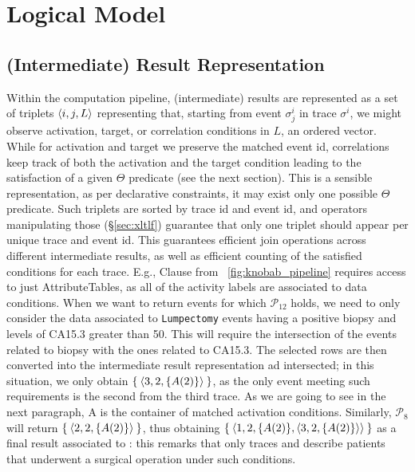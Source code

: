 \section{Logical Model}

\subsection{(Intermediate) Result Representation}
Within the computation pipeline, (intermediate) results are represented as a set of triplets $\braket{i,j,L}$ representing that, starting from event $\sigma^i_j$ in trace $\sigma^i$, we might observe activation, target, or correlation conditions in $L$, an ordered vector.  While for activation and target 
we 
preserve 
the matched event id,
correlations keep track of
both the activation and the target condition leading to the satisfaction of a given $\Theta$ predicate (see the next section). This is a sensible representation, as per declarative constraints, it may exist only one possible $\Theta$ predicate. Such triplets are sorted by trace id and event id, and operators manipulating those (\S\ref{sec:xltlf}) guarantee that only one triplet should appear per unique trace and event id. This guarantees efficient join operations across different intermediate results, as well as efficient counting of the satisfied conditions for each trace. %
E.g., Clause  from \figurename~\ref{fig:knobab_pipeline} requires access to just \textsf{AttributeTable}s, as all of the activity labels are associated to data conditions. When we want to return events for which $\mathcal{P}_{12}$ holds, we need to only consider the data associated to \texttt{Lumpectomy} events having a positive biopsy and levels of CA15.3 greater than 50. This will require the intersection of the events related to biopsy with the ones related to CA15.3. The selected rows are then  converted into the intermediate result representation ad intersected; in this situation, we only obtain $\Set{\braket{3,2,\{A(2)\}}}$, as the only event meeting such requirements is the second from the third trace. 
As we are going to see in the next paragraph, A is the container of matched activation conditions. 
Similarly, $\mathcal{P}_{8}$ will return $\Set{\braket{2,2,\{A(2)\}}}$, thus obtaining $\Set{\braket{1,2,\{A(2)\},\braket{3,2,\{A(2)\}}}}$ as a final result associated to : this remarks that only traces  and  describe patients that underwent a surgical operation under such conditions.

